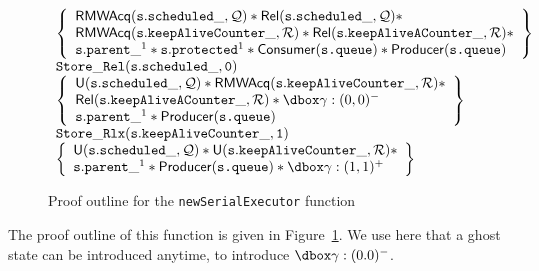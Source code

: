 \begin{figure}
\begin{equation*}
\begin{array}{l}
	\left\{
			\begin{array}{l}
				\mathsf{RMWAcq}(\mathtt{s.scheduled\_}, \mathcal{Q}) * \mathsf{Rel}(\mathtt{s.scheduled\_}, \mathcal{Q}) * \\ 
					\mathsf{RMWAcq}(\mathtt{s.keepAliveCounter\_}, \mathcal{R}) * \mathsf{Rel}(\mathtt{s.keepAliveACounter\_}, \mathcal{R}) * \\
					 \mathtt{s.parent\_}^1 * \mathtt{s.protected}^1 * \consQ * \prodQ
			\end{array} \right\} \\

			\mathtt{Store\_Rel(s.scheduled\_, 0)} \\

	\left\{
			\begin{array}{l}
				\mathsf{U}(\mathtt{s.scheduled\_}, \mathcal{Q}) * \mathsf{RMWAcq}(\mathtt{s.keepAliveCounter\_}, \mathcal{R}) * \\
					\mathsf{Rel}(\mathtt{s.keepAliveACounter\_}, \mathcal{R}) * \ghost{\gamma : (0, 0)^-}\\
				\mathtt{s.parent\_}^1 * \prodQ
			\end{array} \right\} \\

			\mathtt{Store\_Rlx(s.keepAliveCounter\_, 1)} \\

	\left\{
			\begin{array}{l}
				\mathsf{U}(\mathtt{s.scheduled\_}, \mathcal{Q}) * \mathsf{U}(\mathtt{s.keepAliveCounter\_}, \mathcal{R}) * \\
					\mathtt{s.parent\_}^1 * \prodQ * \ghost{\gamma : (1, 1)^+}
			\end{array} \right\} \\



\end{array}
\end{equation*}

		\caption{Proof outline for the \texttt{newSerialExecutor} function}
		\label{fig:proofNew}

\end{figure}

The proof outline of this function is given in Figure~\ref{fig:proofNew}. We use here that a ghost state can be introduced anytime, to introduce $\ghost{\gamma: (0. 0)^-}$. %



